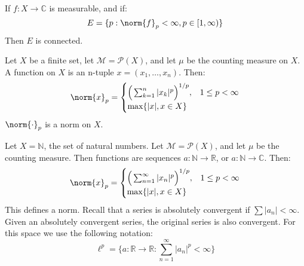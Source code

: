 \documentclass[crop=false,class=article,oneside]{standalone}
\begin{document}
            \begin{theorem}
                If $f:X\rightarrow\mathbb{C}$ is measurable, and if:
                \begin{equation}
                    E=\{p:\norm{f}_{p}<\infty,p\in[1,\infty)\}
                \end{equation}
                Then $E$ is connected.
            \end{theorem}
            \begin{lexample}
                Let $X$ be a finite set, let $\mathcal{M}=\mathcal{P}(X)$,
                and let $\mu$ be the counting measure on $X$. A function on
                $X$ is an n-tuple $x=(x_{1},\dots,x_{n})$. Then:
                \begin{equation}
                    \norm{x}_{p}=
                    \begin{cases}
                        \Big(\sum_{k=1}^{n}|x_{k}|^{p}\Big)^{1/p},
                        &1\leq{p}<\infty\\
                        \max\{|x|,x\in{X}\}
                    \end{cases}
                \end{equation}
                $\norm{\cdot}_{p}$ is a norm on $X$.
            \end{lexample}
            \begin{lexample}
                Let $X=\mathbb{N}$, the set of natural numbers. Let
                $\mathcal{M}=\mathcal{P}(X)$, and let $\mu$ be
                the counting measure. Then functions are sequences
                $a:\mathbb{N}\rightarrow\mathbb{R}$, or
                $a:\mathbb{N}\rightarrow\mathbb{C}$. Then:
                \begin{equation}
                    \norm{x}_{p}=
                    \begin{cases}
                        \Big(\sum_{n=1}^{\infty}|x_{n}|^{p}\Big)^{1/p},
                        &1\leq{p}<\infty\\
                        \max\{|x|,x\in{X}\}
                    \end{cases}
                \end{equation}
                This defines a norm. Recall that a series is
                absolutely convergent if $\sum|a_{n}|<\infty$. Given an
                absolutely convergent series, the original series is also
                convergent. For this space we use the following notation:
                \begin{equation}
                    \ell^{p}=
                    \{a:\mathbb{R}\rightarrow\mathbb{R}:
                        \sum_{n=1}^{\infty}|a_{n}|^{p}<\infty\}
                \end{equation}
            \end{lexample}
\end{document}
